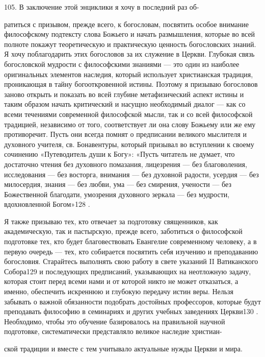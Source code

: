 \documentclass[a5paper,10pt]{article}
\begin{document}
105. В заключение этой энциклики я хочу в последний раз об-

ратиться с призывом, прежде всего, к богословам, посвятить особое внимание
философскому подтексту слова Божьего и начать размышления, которые во всей
полноте покажут теоретическую и практическую ценность богословских знаний. Я
хочу поблагодарить этих богословов за их служение в Церкви. Глубокая связь
богословской мудрости с философскими знаниями — это один из наиболее
оригинальных элементов наследия, который использует христианская традиция,
проникающая в тайну богооткровенной истины. Поэтому я призываю богословов
заново открыть и показать во всей глубине метафизический аспект истины и таким
образом начать критический и насущно необходимый диалог — как со всеми
течениями современной философской мысли, так и со всей философской традицией,
независимо от того, соответствует ли она слову Божьему или же ему противоречит.
Пусть они всегда помнят о предписании великого мыслителя и духовного учителя,
св. Бонавентуры, который призывал во вступлении к своему сочинению
«Путеводитель души к Богу»: «Пусть читатель не думает, что достаточно чтения
без духовного помазания, лицезрения — без благоволения, исследования — без
восторга, внимания — без духовной радости, усердия — без милосердия, знания —
без любви, ума — без смирения, учености — без Божественной благодати, умозрения
духовного зеркала — без мудрости, вдохновленной Богом»128 .

Я также призываю тех, кто отвечает за подготовку священников, как
академическую, так и пастырскую, прежде всего, заботиться о философской
подготовке тех, кто будет благовествовать Евангелие современному человеку, а в
первую очередь — тех, кто собирается посвятить себя изучению и преподаванию
богословия. Старайтесь выполнять свою работу в свете указаний II Ватиканского
Собора129 и последующих предписаний, указывающих на неотложную задачу, которая
стоит перед всеми нами и от которой никто не может отказаться, а именно,
обеспечить искреннюю и глубокую передачу истин веры. Нельзя забывать о важной
обязанности подобрать достойных профессоров, которые будут преподавать
философию в семинариях и других учебных заведениях Церкви130 . Необходимо,
чтобы это обучение базировалось на правильной научной подготовке,
систематически представляло великое наследие христиан-

ской традиции и вместе с тем учитывало актуальные нужды Церкви и мира.
\end{document}
